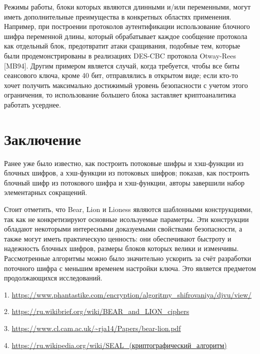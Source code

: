 \documentclass[12pt]{article}
\begin{document}
\vspace{5mm}
Режимы работы, блоки которых являются длинными и/или переменными, могут иметь дополнительные преимущества в конкретных областях применения. Например, при построении протоколов аутентификации использование блочного шифра переменной длины, который обрабатывает каждое сообщение протокола как отдельный блок, предотвратит атаки сращивания, подобные тем, которые были продемонстрированы в реализациях DES-CBC протокола Otway-Rees [MB94]. Другим примером является случай, когда требуется, чтобы все биты сеансового ключа, кроме 40 бит, отправлялись в открытом виде; если кто-то хочет получить максимально достижимый уровень безопасности с учетом этого ограничения, то использование большего блока заставляет криптоаналитика работать усерднее.

\section{Заключение}
Ранее уже было известно, как построить потоковые шифры и хэш-функции
из блочных шифров, а хэш-функции из потоковых шифров; показав, как
построить блочный шифр из потокового шифра и хэш-функции, авторы
завершили набор элементарных сокращений. 

Стоит отметить, что Bear, Lion и Lioness являются шаблонными конструкциями, так как не конкретизируют основные исользуемые параметры. Эти конструкции обладают некоторыми интересными доказуемыми свойствами безопасности, а также могут иметь практическую ценность: они обеспечивают быстроту и надежность блочных шифров, размеры блоков которых велики и изменчивы. Рассмотренные алгоритмы можно было значительно ускорить за счёт разработки поточного шифра с меньшим временем настройки ключа. Это является предметом продолжающихся исследований.






1. \url{https://www.phantastike.com/encryption/algoritmy_shifrovaniya/djvu/view/}

2. \url{https://ru.wikibrief.org/wiki/BEAR_and_LION_ciphers}

3. \url{https://www.cl.cam.ac.uk/~rja14/Papers/bear-lion.pdf}

4. \url{https://ru.wikipedia.org/wiki/SEAL_(криптографический_алгоритм)}
\end{document}
